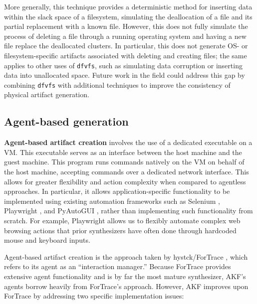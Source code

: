 \documentclass[preprint,12pt]{elsarticle}
\newcommand{\passthrough}[1]{#1}
\begin{document}
More generally, this technique provides a deterministic method for
inserting data within the slack space of a filesystem, simulating the
deallocation of a file and its partial replacement with a known file.
However, this does not fully simulate the process of deleting a file
through a running operating system and having a new file replace the
deallocated clusters. In particular, this does not generate OS- or
filesystem-specific artifacts associated with deleting and creating
files; the same applies to other uses of
\passthrough{\lstinline!dfvfs!}, such as simulating data corruption or
inserting data into unallocated space. Future work in the field could
address this gap by combining \passthrough{\lstinline!dfvfs!} with
additional techniques to improve the consistency of physical artifact
generation.

\subsection{Agent-based generation}\label{agent-based-generation}

\textbf{Agent-based artifact creation} involves the use of a dedicated
executable on a VM. This executable serves as an interface between the
host machine and the guest machine. This program runs commands natively
on the VM on behalf of the host machine, accepting commands over a
dedicated network interface. This allows for greater flexibility and
action complexity when compared to agentless approaches. In particular,
it allows application-specific functionality to be implemented using
existing automation frameworks such as Selenium
\citep{SeleniumHQSelenium2025}, Playwright
\citep{MicrosoftPlaywrightpython2025}, and PyAutoGUI
\citep{sweigartAsweigartPyautogui2025}, rather than implementing such
functionality from scratch. For example, Playwright allows us to
flexibly automate complex web browsing actions that prior synthesizers
have often done through hardcoded mouse and keyboard inputs.

Agent-based artifact creation is the approach taken by hystck/ForTrace
\citep{gobelNovelApproachGenerating2020,gobelForTraceHolisticForensic2022},
which refers to its agent as an ``interaction manager.'' Because
ForTrace provides extensive agent functionality and is by far the most
mature synthesizer, AKF's agents borrow heavily from ForTrace's
approach. However, AKF improves upon ForTrace by addressing two specific
implementation issues:
\end{document}
